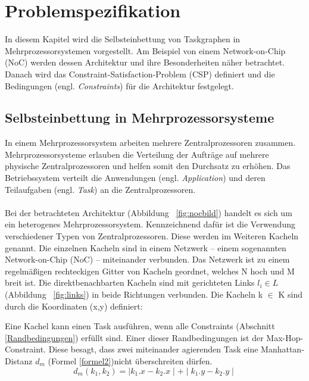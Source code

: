 \chapter{Problemspezifikation}\label{problemspezifikation}

In diesem Kapitel wird die Selbsteinbettung von Taskgraphen in Mehrprozessorsystemen vorgestellt. Am Beispiel von einem Network-on-Chip (NoC) werden dessen Architektur und ihre Besonderheiten näher betrachtet. Danach wird das Constraint-Satisfaction-Problem (CSP) definiert und die Bedingungen (engl. \textit{Constraints}) für die Architektur festgelegt.

\section{Selbsteinbettung in Mehrprozessorsysteme}
In einem Mehrprozessorsystem \cite{Mehrprozessorsysteme} arbeiten mehrere Zentralprozessoren zusammen. 
Mehrprozessorsysteme erlauben die Verteilung der Aufträge auf mehrere physische Zentralprozessoren und helfen somit den Durchsatz zu erhöhen. Das Betriebssystem verteilt die Anwendungen (engl. \textit{Application}) und deren Teilaufgaben (engl. \textit{Task}) an die Zentralprozessoren.  \\%
 


\ \\
Bei der betrachteten Architektur (Abbildung ~\ref{fig:nocbild}) handelt es sich um ein heterogenes Mehrprozessorsystem. Kennzeichnend dafür ist die Verwendung verschiedener Typen von Zentralprozessoren. Diese werden im Weiteren Kacheln genannt. Die einzelnen Kacheln sind in einem Netzwerk -- einem sogenannten Network-on-Chip (NoC) \cite{mappingNocArchitectures} \cite{NOC} -- miteinander verbunden. Das Netzwerk ist zu einem regelmäßigen rechteckigen Gitter von Kacheln geordnet, welches N hoch und M breit ist. Die direktbenachbarten Kacheln sind mit gerichteten Links  $l_i \in L$ (Abbildung ~\ref{fig:links}) in beide Richtungen verbunden. Die Kacheln k $\in$ K sind durch die Koordinaten (x,y) definiert:

Eine Kachel kann einen Task ausführen, wenn alle Constraints (Abschnitt \ref{Randbedingungen}) erfüllt sind. Einer dieser Randbedingungen ist der Max-Hop-Constraint. Diese besagt, dass zwei miteinander agierenden Task eine Manhattan-Distanz  $d_m$ (Formel \ref{formel2})nicht überschreiten dürfen. 
\begin{equation}
d_m (k_1,k_2) = \mid k_1.x - k_2.x \mid + \mid k_1.y - k_2.y \mid 
\label{formel2}
\end{equation}

